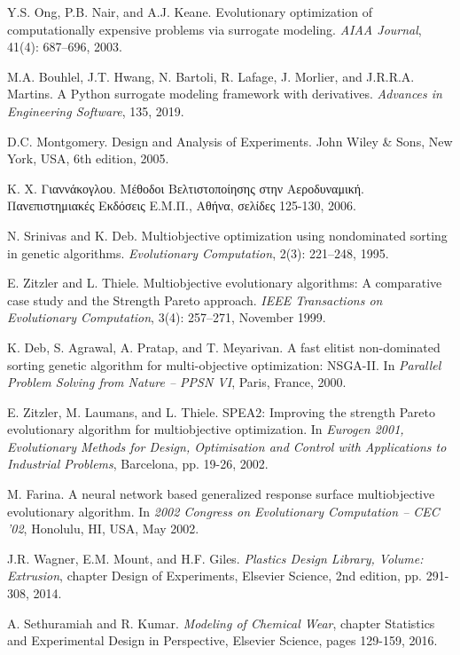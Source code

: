 Y.S. Ong, P.B. Nair, and A.J. Keane. Evolutionary 
optimization of computationally expensive problems via 
surrogate modeling. \textit{AIAA Journal}, 
41(4): 687–696, 2003.

M.A. Bouhlel, J.T. Hwang, N. Bartoli, R. Lafage, 
J. Morlier, and J.R.R.A. Martins. A Python surrogate 
modeling framework with derivatives. \textit{Advances 
in Engineering Software}, 135, 2019.

D.C. Montgomery. Design and Analysis of Experiments. John 
Wiley \& Sons, New York, USA, 6th edition, 2005.

 Κ. Χ. Γιαννάκογλου. Μέθοδοι Βελτιστοποίησης 
στην Αεροδυναμική. Πανεπιστημιακές Εκδόσεις Ε.Μ.Π., 
Αθήνα, σελίδες 125-130, 2006.

N. Srinivas and K. Deb. Multiobjective optimization using 
nondominated sorting in genetic algorithms. 
\textit{Evolutionary Computation}, 2(3): 221–248, 1995.

E. Zitzler and L. Thiele. Multiobjective evolutionary 
algorithms: A comparative case study and the Strength 
Pareto approach. \textit{IEEE Transactions on Evolutionary
Computation}, 3(4): 257–271, November 1999.

K. Deb, S. Agrawal, A. Pratap, and T. Meyarivan. A fast 
elitist non-dominated sorting genetic algorithm for 
multi-objective optimization: NSGA-II. In
\textit{Parallel Problem Solving from Nature – PPSN 
VI}, Paris, France, 2000. 

E. Zitzler, M. Laumans, and L. Thiele. SPEA2: Improving 
the strength Pareto evolutionary algorithm for 
multiobjective optimization. In \textit{Eurogen 2001, 
Evolutionary Methods for Design, Optimisation and Control 
with Applications to Industrial Problems}, Barcelona, 
pp. 19-26, 2002.

M. Farina. A neural network based generalized response 
surface multiobjective evolutionary algorithm. In 
\textit{2002 Congress on Evolutionary Computation – CEC 
’02}, Honolulu, HI, USA, May 2002.

J.R. Wagner, E.M. Mount, and H.F. Giles. \textit{Plastics 
Design Library, Volume: Extrusion}, chapter Design of 
Experiments, Elsevier Science, 2nd edition, pp. 291-308, 
2014.

A. Sethuramiah and R. Kumar. \textit{Modeling of Chemical 
Wear}, chapter Statistics and Experimental Design in 
Perspective, Elsevier Science, pages 129-159, 2016.

